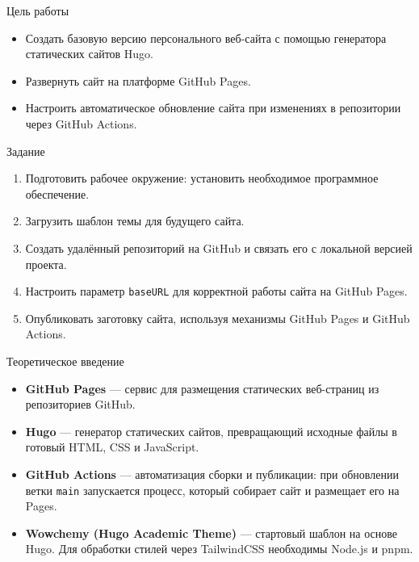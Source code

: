 \documentclass[
  ignorenonframetext,
  aspectratio=169,
  russian,
  aspectratio=169]{beamer}
\providecommand{\tightlist}{%
  \setlength{\itemsep}{0pt}\setlength{\parskip}{0pt}}
\begin{document}
\begin{frame}{Цель работы}
\label{ux446ux435ux43bux44c-ux440ux430ux431ux43eux442ux44b}
\begin{itemize}[<+->]
\tightlist
\item
  Создать базовую версию персонального веб-сайта с помощью генератора
  статических сайтов Hugo.
\item
  Развернуть сайт на платформе GitHub Pages.
\item
  Настроить автоматическое обновление сайта при изменениях в репозитории
  через GitHub Actions.
\end{itemize}
\end{frame}

\begin{frame}[fragile]{Задание}
\label{ux437ux430ux434ux430ux43dux438ux435}
\begin{enumerate}[<+->]
\tightlist
\item
  Подготовить рабочее окружение: установить необходимое программное
  обеспечение.
\item
  Загрузить шаблон темы для будущего сайта.
\item
  Создать удалённый репозиторий на GitHub и связать его с локальной
  версией проекта.
\item
  Настроить параметр \texttt{baseURL} для корректной работы сайта на
  GitHub Pages.
\item
  Опубликовать заготовку сайта, используя механизмы GitHub Pages и
  GitHub Actions.
\end{enumerate}
\end{frame}

\begin{frame}[fragile]{Теоретическое введение}
\label{ux442ux435ux43eux440ux435ux442ux438ux447ux435ux441ux43aux43eux435-ux432ux432ux435ux434ux435ux43dux438ux435}
\begin{itemize}[<+->]
\tightlist
\item
  \textbf{GitHub Pages} --- сервис для размещения статических
  веб-страниц из репозиториев GitHub.
\item
  \textbf{Hugo} --- генератор статических сайтов, превращающий исходные
  файлы в готовый HTML, CSS и JavaScript.
\item
  \textbf{GitHub Actions} --- автоматизация сборки и публикации: при
  обновлении ветки \texttt{main} запускается процесс, который собирает
  сайт и размещает его на Pages.
\item
  \textbf{Wowchemy (Hugo Academic Theme)} --- стартовый шаблон на основе
  Hugo. Для обработки стилей через TailwindCSS необходимы Node.js и
  pnpm.
\end{itemize}
\end{frame}
\end{document}
